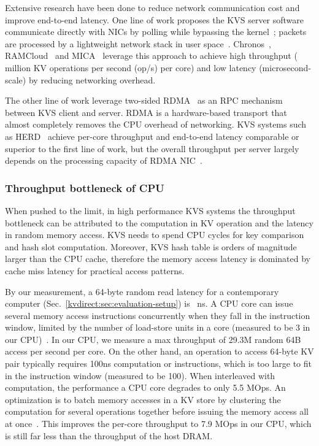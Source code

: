 {Extensive research have been done to reduce network communication cost and improve end-to-end latency.
One line of work proposes the KVS server software communicate directly with NICs by polling while bypassing the kernel~\cite{rizzo2012netmap, intel2014data}; packets are processed by a lightweight network stack in user space~\cite{jeong2014mtcp, marinos2014network}.
Chronos~\cite{kapoor2012chronos}, RAMCloud~\cite{ousterhout2010case, ousterhout2015ramcloud} and MICA~\cite{lim2014mica,li2016full} leverage this approach to achieve high throughput ( million KV operations per second (op/s) per core) and low latency (microsecond-scale) by reducing networking overhead.

The other line of work leverage two-sided RDMA~\cite{infiniband2000infiniband} as an RPC mechanism between KVS client and server.
RDMA is a hardware-based transport that almost completely removes the CPU overhead of networking.
KVS systems such as HERD~\cite{kalia2014using, kalia2016design} achieve per-core throughput and end-to-end latency comparable or superior to the first line of work, but the overall throughput per server largely depends on the processing capacity of RDMA NIC~\cite{kalia2016design}.

\subsubsection{Throughput bottleneck of CPU}
\label{kvdirect:sec:CPU-KV-Bottleneck}
When pushed to the limit, in high performance KVS systems the throughput bottleneck can be attributed to the computation in KV operation and the latency in random memory access. KVS needs to spend CPU cycles for key comparison and hash slot computation. Moreover, KVS hash table is orders of magnitude larger than the CPU cache, therefore the memory access latency is dominated by cache miss latency for practical access patterns.

By our measurement, a 64-byte random read latency for a contemporary computer (Sec.~\ref{kvdirect:sec:evaluation-setup}) is ~ns. A CPU core can issue several memory access instructions concurrently when they fall in the instruction window, limited by the number of load-store units in a core (measured to be 3 in our CPU)~\cite{gharachorloo1992hiding, han2010packetshader, zhang2015mega}. In our CPU, we measure a max throughput of 29.3M random 64B access per second per core. On the other hand, an operation to access 64-byte KV pair typically requires \approx100ns computation or  instructions, which is too large to fit in the instruction window (measured to be 100). When interleaved with computation, the performance a CPU core degrades to only 5.5 MOps. An optimization is to batch memory accesses in a KV store by clustering the computation for several operations together before issuing the memory access all at once~\cite{li2016full, narula2014phase}. This improves the per-core throughput to 7.9 MOps in our CPU, which is still far less than the throughput of the host DRAM. 
}


